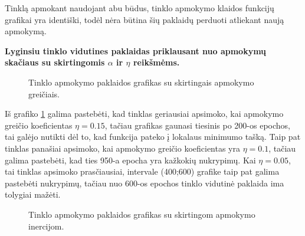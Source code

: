 Tinklą apmokant naudojant abu būdus, tinklo apmokymo klaidos funkcijų grafikai yra identiški, todėl nėra būtina šių paklaidų perduoti atliekant naują apmokymą.

\textbf{Lyginsiu tinklo vidutines paklaidas priklausant nuo apmokymų skačiaus su skirtingomis $\alpha$ ir $\eta$ reikšmėms.}
\clearpage
\begin{figure}[h!]
  \centering
{}
\caption{Tinklo apmokymo paklaidos grafikas su skirtingais apmokymo greičiais.}
\label{fig:etakitimas}
\end{figure}

Iš grafiko \ref{fig:etakitimas} galima pastebėti, kad tinklas geriausiai apsimoko, kai apmokymo greičio koeficientas $\eta=0.15$, tačiau grafikas gaunasi tiesinis po 200-os epochos, tai galėjo nutikti dėl to, kad funkcija pateko į lokalaus minimumo tašką. Taip pat tinklas panašiai apsimoko, kai apmokymo greičio koeficientas yra $\eta=0.1$, tačiau galima pastebėti, kad ties 950-a epocha yra kažkokių nukrypimų. Kai $\eta=0.05$, tai tinklas apsimoko prasčiausiai, intervale (400;600) grafike taip pat galima pastebėti nukrypimų, tačiau nuo 600-os epochos tinklo vidutinė paklaida ima tolygiai mažėti.


\begin{figure}[h!]
  \centering
{}
\caption{Tinklo apmokymo paklaidos grafikas su skirtingom apmokymo inercijom.}
\label{fig:alphakitimas}
\end{figure}

